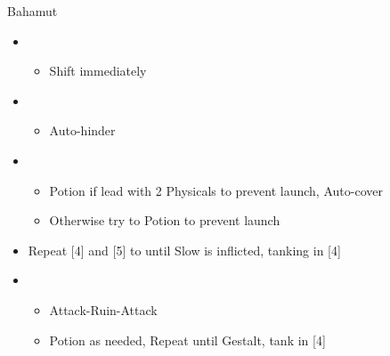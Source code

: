 \begin{paracol}{2}
\begin{battle}{Bahamut}
\begin{itemize}
    \item \first
    \begin{itemize}
        \item Shift immediately
    \end{itemize}
    \item \fifth
    \begin{itemize}
        \item Auto-hinder
    \end{itemize}
    \item \fourth
    \begin{itemize}
        \item Potion if lead with 2 Physicals to prevent launch, Auto-cover
        \item Otherwise try to Potion to prevent launch
    \end{itemize}
    \item Repeat [4] and [5] to until Slow is inflicted, tanking in [4]
    \item \first
    \begin{itemize}
        \item Attack-Ruin-Attack
        \item Potion as needed, Repeat until Gestalt, tank in [4]
    \end{itemize}
\end{itemize}
\end{battle}
\end{paracol}
